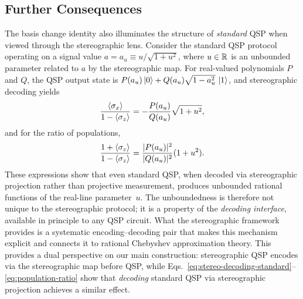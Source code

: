 \subsection{Further Consequences}
\label{subsec:further-consequences}

The basis change identity also illuminates the structure of
\emph{standard} QSP when viewed through the stereographic
lens.  Consider the standard QSP protocol operating on a
signal value $a = a_u \equiv u/\sqrt{1+u^2}$, where
$u \in \mathbb{R}$ is an unbounded parameter related to $a$ by the
stereographic map.  For real-valued polynomials $P$ and $Q$,
the QSP output state is
$P(a_u)\ket{0} + Q(a_u)\sqrt{1-a_u^2}\,\ket{1}$, and
stereographic decoding yields
\begin{equation}
	\frac{\langle\sigma_x\rangle}{1 - \langle\sigma_z\rangle} = -\frac{P(a_u)}{Q(a_u)}\sqrt{1+u^2},
	\label{eq:stereo-decoding-standard}
\end{equation}
and for the ratio of populations,
\begin{equation}
	\frac{1+\langle\sigma_z\rangle}{1-\langle\sigma_z\rangle} = \frac{|P(a_u)|^2}{|Q(a_u)|^2}(1+u^2).
	\label{eq:population-ratio}
\end{equation}
These expressions show that even standard QSP, when decoded
via stereographic projection rather than projective
measurement, produces unbounded rational functions of the
real-line parameter~$u$.  The unboundedness is therefore not
unique to the stereographic protocol; it is a property of the
\emph{decoding interface}, available in principle to any QSP
circuit.  What the stereographic framework provides is a
systematic encoding--decoding pair that makes this mechanism
explicit and connects it to rational Chebyshev approximation
theory.  This provides a dual perspective on our main
construction: stereographic QSP encodes via the stereographic
map before QSP, while
Eqs.~\eqref{eq:stereo-decoding-standard}--\eqref{eq:population-ratio}
show that \emph{decoding} standard QSP via stereographic
projection achieves a similar effect.

